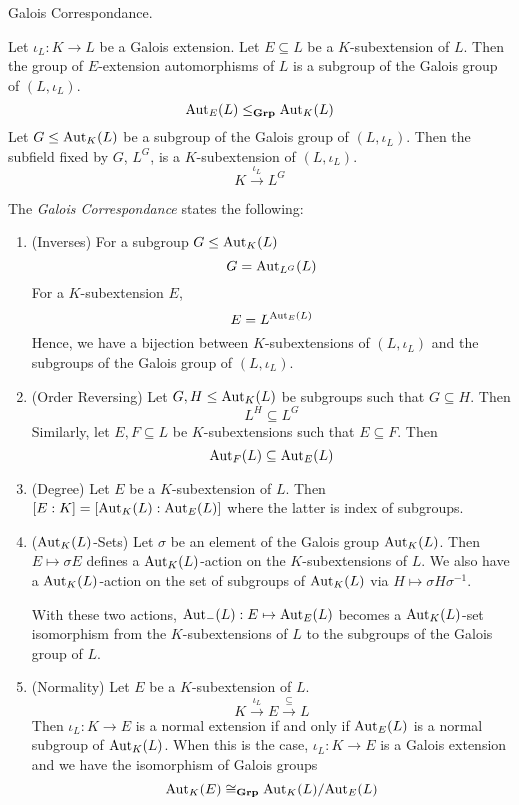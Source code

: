 \documentclass[../book.tex]{subfiles}
\begin{document}
\begin{thm} Galois Correspondance. 
    
    Let $\iota_L : K \to L$ be a Galois extension.
    Let $E \subseteq L$ be a $K$-subextension of $L$. 
    Then the group of $E$-extension automorphisms of $L$ is
    a subgroup of the Galois group of $(L,\iota_L)$. \[
        \text{Aut}_{E}(L) \leq_{\mathbf{Grp}} \text{Aut}_{K}(L)
    \]
    Let $G \leq \text{Aut}_{K}(L)$ be a subgroup of the Galois group of $(L,\iota_L)$. 
    Then the subfield fixed by $G$, $L^G$, is a $K$-subextension of $(L,\iota_L)$.
    \[ K \overset{\iota_L}{\to} L^G \]
    
    The \emph{Galois Correspondance} states the following: 
    \begin{enumerate}
        \item (Inverses)
            For a subgroup $G \leq \text{Aut}_{K}(L)$ \[
                G = \text{Aut}_{L^G}(L)
            \]
            For a $K$-subextension $E$, \[
                E = L^{\text{Aut}_{E}(L)}
            \]
            Hence, we have a bijection between $K$-subextensions of $(L,\iota_L)$
            and the subgroups of the Galois group of $(L,\iota_L)$.
        \item (Order Reversing) 
            Let $G, H \leq \text{Aut}_{K}(L)$ be subgroups such that $G \subseteq H$.
            Then \[ L^H \subseteq L^G \]
            Similarly, 
            let $E, F \subseteq L$ be $K$-subextensions such that $E \subseteq F$.
            Then \[ \text{Aut}_{F}(L) \subseteq \text{Aut}_{E}(L) \]
        \item (Degree) 
            Let $E$ be a $K$-subextension of $L$. 
            Then $[E : K] = [\text{Aut}_{K}(L) : \text{Aut}_{E}(L)]$
            where the latter is index of subgroups. 
        \item ($\text{Aut}_{K}(L)$-Sets)
            Let $\sigma$ be an element of the Galois group $\text{Aut}_{K}(L)$.
            Then $E \mapsto \sigma E$ defines a $\text{Aut}_{K}(L)$-action
            on the $K$-subextensions of $L$. 
            We also have a $\text{Aut}_{K}(L)$-action 
            on the set of subgroups of $\text{Aut}_{K}(L)$ via 
            $H \mapsto \sigma H \sigma^{-1}$.
            
            With these two actions, $\text{Aut}_{-}(L) : E \mapsto \text{Aut}_{E}(L)$
            becomes a $\text{Aut}_{K}(L)$-set isomorphism from the $K$-subextensions of $L$
            to the subgroups of the Galois group of $L$. 
        \item (Normality)
            Let $E$ be a $K$-subextension of $L$. \[
                K \overset{\iota_L}{\to} E \overset{\subseteq}{\to} L
            \]
            Then $\iota_L : K \to E$ is a normal extension if and only if
            $\text{Aut}_{E}(L)$ is a normal subgroup of $\text{Aut}_{K}(L)$. 
            When this is the case, $\iota_L : K \to E$ is a Galois extension
            and we have the isomorphism of Galois groups \[
                \text{Aut}_{K}(E) \cong_{\mathbf{Grp}} \text{Aut}_{K}(L) / \text{Aut}_{E}(L)
            \]
    \end{enumerate}
\end{thm}
\end{document}
